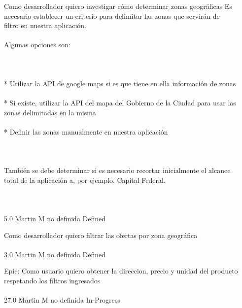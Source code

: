 	{Como desarrollador quiero investigar cómo determinar zonas geográficas} %
	{Es necesario establecer un criterio para delimitar las zonas que servirán de\\
filtro en nuestra aplicación.\\
\\
Algunas opciones son:\\
\\
  \\
\\
* Utilizar la API de google maps si es que tiene en ella información de zonas\\
\\
* Si existe, utilizar la API del mapa del Gobierno de la Ciudad para usar las zonas delimitadas en la misma\\
\\
* Definir las zonas manualmente en nuestra aplicación\\
\\
  \\
\\
También se debe determinar si es necesario recortar inicialmente el alcance\\
total de la aplicación a, por ejemplo, Capital Federal.\\
\\
  \\
\\
} %
	{} %
	{5.0} %
	{Martin M} %
	{no definida} %
	{Defined} %


\vspace{20pt}

	{Como desarrollador quiero filtrar las ofertas por zona geográfica} %
	{\\
\\
} %
	{} %
	{3.0} %
	{Martin M} %
	{no definida} %
	{Defined} %


\vspace{20pt}

	{Epic: Como usuario quiero obtener la direccion, precio y unidad del producto respetando los filtros ingresados} %
	{\\
\\
} %
	{} %
	{27.0} %
	{Martin M} %
	{no definida} %
	{In-Progress} %


